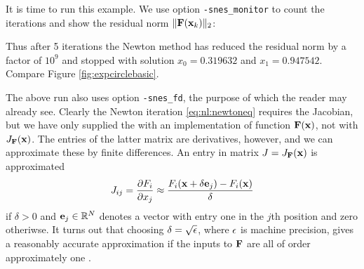 It is time to run this example.  We use option \texttt{-snes\_monitor} to count the iterations and show the residual norm $\|\mathbf{F}(\mathbf{x}_k)\|_2$:
Thus after 5 iterations the Newton method has reduced the residual norm by a factor of $10^9$ and stopped with solution $x_0=0.319632$ and $x_1=0.947542$.  Compare Figure \ref{fig:expcirclebasic}.

The above run also uses option \texttt{-snes\_fd}, the purpose of which the reader may already see.  Clearly the Newton iteration \eqref{eq:nl:newtoneq} requires the Jacobian, but we have only supplied the \pSNES with an implementation of function $\mathbf{F}(\mathbf{x})$, not with $J_{\mathbf{F}}(\mathbf{x})$.  The entries of the latter matrix are derivatives, however, and we can approximate these by finite differences.  An entry in matrix $J=J_{\mathbf{F}}(\mathbf{x})$ is approximated
\begin{equation}
J_{ij} = \frac{\partial F_i}{\partial x_j} \approx \frac{F_i(\mathbf{x}+\delta \mathbf{e}_j) - F_i(\mathbf{x})}{\delta}  \label{eq:nl:examplefdjac}
\end{equation}
if $\delta>0$ and $\mathbf{e}_j\in \mathbb{R}^N$ denotes a vector with entry one in the $j$th position and zero otheriwse.  It turns out that choosing $\delta = \sqrt{\epsilon}$, where $\epsilon$ is machine precision, gives a reasonably accurate approximation if the inputs to $\mathbf{F}$ are all of order approximately one \citep{Kelley2003}.

